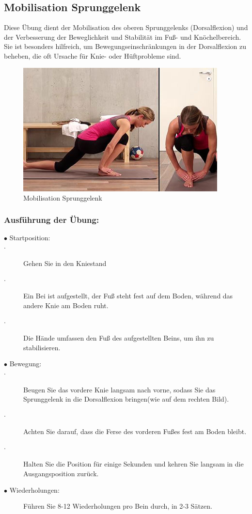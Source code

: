 \subsection{Mobilisation Sprunggelenk}

Diese Übung dient der Mobilisation des oberen Sprunggelenks (Dorsalflexion) und der Verbesserung der Beweglichkeit und Stabilität im Fuß- und Knöchelbereich. Sie ist besonders hilfreich, um Bewegungseinschränkungen in der Dorsalflexion zu beheben, die oft Ursache für Knie- oder Hüftprobleme sind.

\begin{figure}
    \centering
    \includegraphics[width=0.5\linewidth]{img/Sprunggelenk-Mobilisation.JPG}
    \caption{Mobilisation Sprunggelenk \cite{valife}}
    \label{Mobilisation-Sprunggelenk}
\end{figure}


\subsubsection{Ausführung der Übung:}

\begin{description}
    \item[$\bullet$ Startposition:]
        \item[$\cdot$]Gehen Sie in den Kniestand
        \item[$\cdot$]Ein Bei ist aufgestellt, der Fuß steht fest auf dem Boden, während das andere Knie am Boden ruht.
        \item[$\cdot$]Die Hände umfassen den Fuß des aufgestellten Beins, um ihn zu stabilisieren.
    \item[$\bullet$ Bewegung: ]
        \item[$\cdot$]Beugen Sie das vordere Knie langsam nach vorne, sodass Sie das Sprunggelenk in die Dorsalflexion bringen(wie auf dem rechten Bild).
        \item[$\cdot$] Achten Sie darauf, dass die Ferse des vorderen Fußes fest am Boden bleibt.
        \item[$\cdot$]Halten Sie die Position für einige Sekunden und kehren Sie langsam in die Ausgangsposition zurück.
    \item[$\bullet$ Wiederholungen: ] Führen Sie 8-12 Wiederholungen pro Bein durch, in 2-3 Sätzen.

\end{description}

